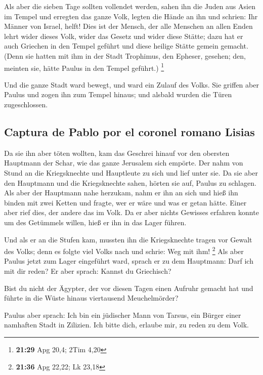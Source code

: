  Als aber die sieben Tage sollten vollendet werden, sahen
ihn die Juden aus Asien im Tempel und erregten das ganze Volk, legten
die Hände an ihn und schrien:  Ihr Männer von Israel,
helft! Dies ist der Mensch, der alle Menschen an allen Enden lehrt wider
dieses Volk, wider das Gesetz und wider diese Stätte; dazu hat er auch
Griechen in den Tempel geführt und diese heilige Stätte gemein gemacht.
 (Denn sie hatten mit ihm in der Stadt Trophimus, den
Epheser, gesehen; den, meinten sie, hätte Paulus in den Tempel geführt.)
\footnote{\textbf{21:29} Apg 20,4; 2Tim 4,20}

 Und die ganze Stadt ward bewegt, und ward ein Zulauf des
Volks. Sie griffen aber Paulus und zogen ihn zum Tempel hinaus; und
alsbald wurden die Türen zugeschlossen.

\hypertarget{captura-de-pablo-por-el-coronel-romano-lisias}{%
\subsection{Captura de Pablo por el coronel romano
Lisias}\label{captura-de-pablo-por-el-coronel-romano-lisias}}

 Da sie ihn aber töten wollten, kam das Geschrei hinauf
vor den obersten Hauptmann der Schar, wie das ganze Jerusalem sich
empörte.  Der nahm von Stund an die Kriegsknechte und
Hauptleute zu sich und lief unter sie. Da sie aber den Hauptmann und die
Kriegsknechte sahen, hörten sie auf, Paulus zu schlagen. 
Als aber der Hauptmann nahe herzukam, nahm er ihn an sich und hieß ihn
binden mit zwei Ketten und fragte, wer er wäre und was er getan hätte.
 Einer aber rief dies, der andere das im Volk. Da er aber
nichts Gewisses erfahren konnte um des Getümmels willen, hieß er ihn in
das Lager führen.

 Und als er an die Stufen kam, mussten ihn die
Kriegsknechte tragen vor Gewalt des Volks;  denn es
folgte viel Volks nach und schrie: Weg mit ihm! \footnote{\textbf{21:36}
  Apg 22,22; Lk 23,18}  Als aber Paulus jetzt zum Lager
eingeführt ward, sprach er zu dem Hauptmann: Darf ich mit dir reden? Er
aber sprach: Kannst du Griechisch?

 Bist du nicht der Ägypter, der vor diesen Tagen einen
Aufruhr gemacht hat und führte in die Wüste hinaus viertausend
Meuchelmörder?

 Paulus aber sprach: Ich bin ein jüdischer Mann von
Tarsus, ein Bürger einer namhaften Stadt in Zilizien. Ich bitte dich,
erlaube mir, zu reden zu dem Volk.

